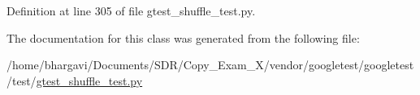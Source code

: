 Definition at line 305 of file gtest\+\_\+shuffle\+\_\+test.\+py.



The documentation for this class was generated from the following file\+:\begin{DoxyCompactItemize}
\item 
/home/bhargavi/\+Documents/\+S\+D\+R/\+Copy\+\_\+\+Exam\+\_\+X/vendor/googletest/googletest/test/\hyperlink{gtest__shuffle__test_8py}{gtest\+\_\+shuffle\+\_\+test.\+py}\end{DoxyCompactItemize}
